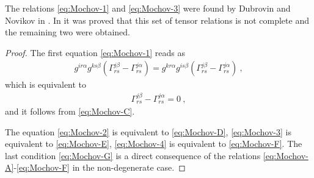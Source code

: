\begin{remark}
    The relations \eqref{eq:Mochov-1} and \eqref{eq:Mochov-3} were found by Dubrovin and Novikov in \cite{Dubrovin-Novikov}. In \cite{Mochov} it was proved that this set of tensor relations is not complete and the remaining two were obtained.
\end{remark}

\begin{proof}
    The first equation \eqref{eq:Mochov-1} reads as
    \begin{align}
        g^{ir \alpha} g^{ks \beta} (\Gamma^{j\beta}_{rs} - \Gamma^{j \alpha}_{rs}) = g^{kr \alpha} g^{is \beta} (\Gamma^{j\beta}_{rs} - \Gamma^{j \alpha}_{rs}) \:,
    \end{align}
    which is equivalent to
    \begin{align}
        \Gamma^{j \beta}_{rs} - \Gamma^{j \alpha}_{rs} = 0 \:,
    \end{align}
    and it follows from \eqref{eq:Mochov-C}.

    The equation \eqref{eq:Mochov-2} is equivalent to \eqref{eq:Mochov-D}, \eqref{eq:Mochov-3} is equivalent to \eqref{eq:Mochov-E}, \eqref{eq:Mochov-4} is equivalent to \eqref{eq:Mochov-F}. The last condition \eqref{eq:Mochov-G} is a direct consequence of the relations \eqref{eq:Mochov-A}-\eqref{eq:Mochov-F} in the non-degenerate case.
\end{proof}

